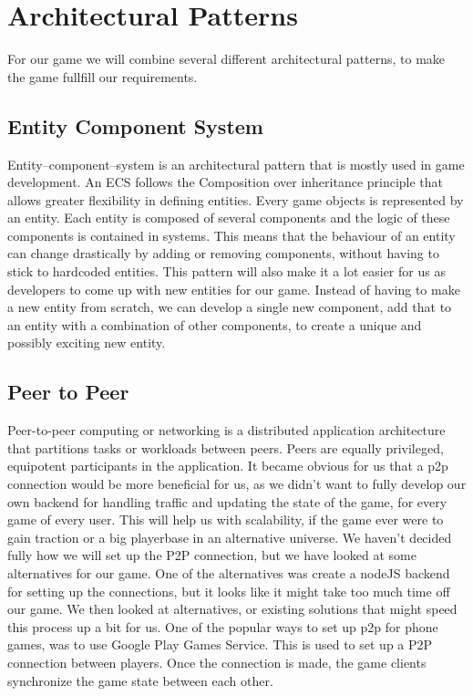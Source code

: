 \section{Architectural Patterns}
For our game we will combine several different architectural patterns, to make the game fullfill our requirements. 

\subsection{Entity Component System}
Entity–component–system \cite{wiki:ecs} is an architectural pattern that is mostly used in game development. An ECS follows the Composition over inheritance principle that allows greater flexibility in defining entities. 
Every game objects is represented by an entity. Each entity is composed of several components and the logic of these components is contained in systems. This means that the behaviour of an entity can change drastically by adding or removing components, without having to stick to hardcoded entities.
This pattern will also make it a lot easier for us as developers to come up with new entities for our game. Instead of having to make a new entity from scratch, we can develop a single new component, add that to an entity with a combination of other components, to create a unique and possibly exciting new entity.
	
\subsection{Peer to Peer}
Peer-to-peer \cite{wiki:p2p} computing or networking is a distributed application architecture that partitions tasks or workloads between peers. Peers are equally privileged, equipotent participants in the application.
It became obvious for us that a p2p connection would be more beneficial for us, as we didn't want to fully develop our own backend for handling traffic and updating the state of the game, for every game of every user. This will help us with scalability, if the game ever were to gain traction or a big playerbase in an alternative universe.
We haven't decided fully how we will set up the P2P connection, but we have looked at some alternatives for our game.
One of the alternatives was create a nodeJS backend for setting up the connections, but it looks like it might take too much time off our game. We then looked at alternatives, or existing solutions that might speed this process up a bit for us. 
One of the popular ways to set up p2p for phone games, was to use Google Play Games Service. This is used to set up a P2P connection between players. Once the connection is made, the game clients synchronize the game state between each other.

